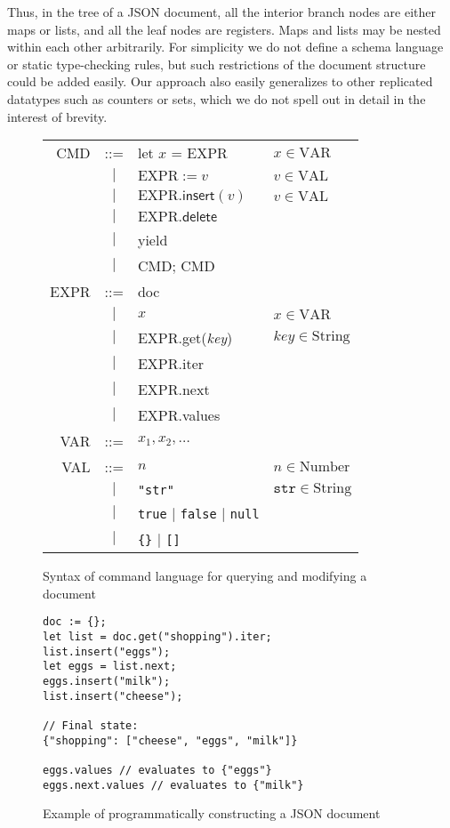 \documentclass[a4paper,twocolumn,10pt]{article}
\begin{document}
Thus, in the tree of a JSON document, all the interior branch nodes are either maps or lists, and all the leaf nodes are registers. Maps and lists may be nested within each other arbitrarily. For simplicity we do not define a schema language or static type-checking rules, but such restrictions of the document structure could be added easily. Our approach also easily generalizes to other replicated datatypes such as counters or sets, which we do not spell out in detail in the interest of brevity.

\begin{figure}
\centering
\begin{tabular}{rcll}
CMD & ::= & \textsf{let} $x$ = EXPR & $x \in \mathrm{VAR}$ \\
& $|$ & $\mathrm{EXPR} := v$ & $v \in \mathrm{VAL}$ \\
& $|$ & $\mathrm{EXPR}.\mathsf{insert}(v)$ & $v \in \mathrm{VAL}$ \\
& $|$ & $\mathrm{EXPR}.\mathsf{delete}$ \\
& $|$ & \textsf{yield} \\
& $|$ & CMD; CMD \vspace{0.5em}\\
EXPR & ::= & \textsf{doc} \\
& $|$ & $x$ & $x \in \mathrm{VAR}$ \\
& $|$ & EXPR.\textsf{get}(\textit{key}) & $\mathit{key} \in \mathrm{String}$ \\
& $|$ & EXPR.\textsf{iter} \\
& $|$ & EXPR.\textsf{next} \\
& $|$ & EXPR.\textsf{values} \vspace{0.5em}\\
VAR & ::= & ${x_1, x_2, \dots}$ \vspace{0.5em}\\
VAL & ::= & $n$ & $n \in \mathrm{Number}$ \\
& $|$ & \verb|"str"| & $\mathtt{str} \in \mathrm{String}$ \\
& $|$ & \verb|true| $|$ \verb|false| $|$ \verb|null| \\
& $|$ & \verb|{}| $|$ \verb|[]|
\end{tabular}
\caption{Syntax of command language for querying and modifying a document}\label{fig:local-syntax}
\end{figure}

\begin{figure}
\centering
\begin{verbatim}
doc := {};
let list = doc.get("shopping").iter;
list.insert("eggs");
let eggs = list.next;
eggs.insert("milk");
list.insert("cheese");

// Final state:
{"shopping": ["cheese", "eggs", "milk"]}

eggs.values // evaluates to {"eggs"}
eggs.next.values // evaluates to {"milk"}
\end{verbatim}
\caption{Example of programmatically constructing a JSON document}\label{fig:make-doc}
\end{figure}
\end{document}
